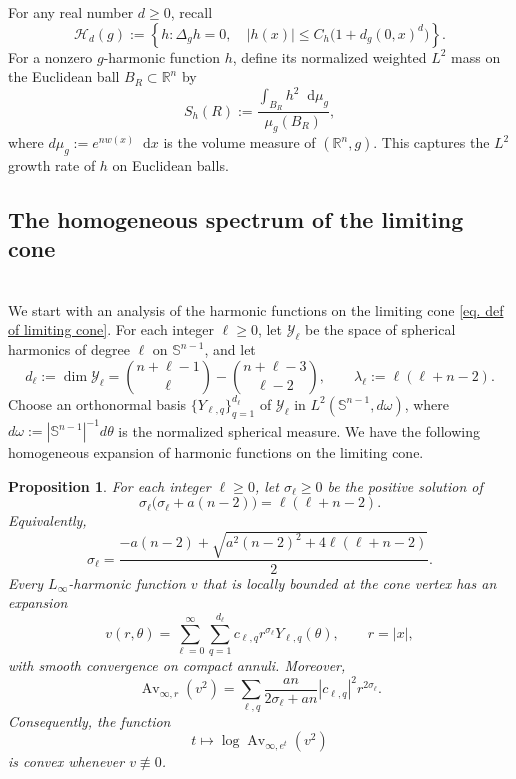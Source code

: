 \documentclass[12pt]{amsart}
\theoremstyle{plain}
\newtheorem{proposition}[theorem]{Proposition}
\theoremstyle{definition}
\theoremstyle{remark}     %
\numberwithin{equation}{section}
\newcommand{\dd}{\mathop{}\!\mathrm{d}}%
\begin{document}
For any real number $d\geq0$, recall
\[
    \mathcal H_d(g)
    :=\left\{
    h:\Delta_gh=0,
    \quad |h(x)|\leq C_h\bigl(1+d_g(0,x)^d\bigr)
    \right\}.
\]
For a nonzero $g$-harmonic function $h$, define its normalized weighted
$L^2$ mass on the Euclidean ball $B_R\subset\mathbb R^n$ by
\begin{equation}\label{eq:def-Sh}
    S_h(R)
    :=
\frac{\displaystyle\int_{B_R}h^2\dd\mu_g}
        {\displaystyle\mu_g(B_R)},
\end{equation}
where $d\mu_g:=e^{nw(x)}\dd x$ is the volume measure of $(\mathbb{R}^n,g)$. This captures the $L^2$ growth rate of $h$ on Euclidean balls.

\subsection{The homogeneous spectrum of the limiting cone}
\ \\
We start with an analysis of the harmonic functions on the limiting cone \cref{eq. def of limiting cone}.
For each integer $\ell\geq0$, let $\mathcal Y_\ell$ be the space of spherical harmonics of degree $\ell$
on $\mathbb S^{n-1}$, and let
\[
    d_\ell:=\dim\mathcal Y_\ell
    =\binom{n+\ell-1}{\ell}-\binom{n+\ell-3}{\ell-2},
    \qquad
    \lambda_\ell:=\ell(\ell+n-2).
\]
Choose an orthonormal basis
$\{Y_{\ell,q}\}_{q=1}^{d_\ell}$ of $\mathcal Y_\ell$ in
$L^2(\mathbb S^{n-1},d\omega)$, where $d\omega:=|\mathbb S^{n-1}|^{-1}d\theta$ is the normalized spherical measure. We have the following homogeneous expansion of harmonic functions on the limiting cone.

\begin{proposition}
\label{prop:cone-homogeneous-expansion}
For each integer $\ell\geq0$, let $\sigma_\ell\geq0$ be the positive solution of
\[
    \sigma_\ell\bigl(\sigma_\ell+a(n-2)\bigr)
    =\ell(\ell+n-2).
\]
Equivalently,
\begin{equation}\label{eq:sigma-explicit}
    \sigma_\ell
    =\frac{-a(n-2)+
    \sqrt{a^2(n-2)^2+4\ell(\ell+n-2)}}{2}.
\end{equation}
Every $L_\infty$-harmonic function $v$ that is locally bounded at the cone
vertex has an expansion
\begin{equation}\label{eq:cone-expansion}
    v(r,\theta)
    =\sum_{\ell=0}^{\infty}\sum_{q=1}^{d_\ell}
    c_{\ell,q}r^{\sigma_\ell}Y_{\ell,q}(\theta),
    \qquad r=|x|,
\end{equation}
with smooth convergence on compact annuli.  Moreover,
\begin{equation}\label{eq:cone-average-expansion}
    \operatorname{Av}_{\infty,r}(v^2)
    =\sum_{\ell,q}
    \frac{an}{2\sigma_\ell+an}
    |c_{\ell,q}|^2r^{2\sigma_\ell}.
\end{equation}
Consequently, the function
\[
    t\longmapsto\log \operatorname{Av}_{\infty, e^t}(v^2)
\]
is convex whenever $v\not\equiv0$.
\end{proposition}
\end{document}
